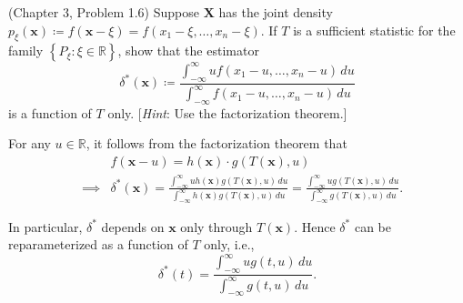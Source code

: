 \begin{question}
  (Chapter 3, Problem 1.6) Suppose \( \mathbf{X} \) has the joint density \( p_\xi(\mathbf{x}) \coloneqq f(\mathbf{x} - \xi) = f(x_1 - \xi,\ldots, x_n - \xi) \). If \( T \) is a sufficient statistic for the family \( \left\{ P_\xi : \xi \in \mathbb{ R } \right\} \), show that the estimator
  \[
    \delta^{*}(\mathbf{x}) \coloneqq \frac{\int_{-\infty}^{\infty} uf(x_1 - u, \ldots, x_n - u)\,du}{\int_{-\infty}^{\infty} f(x_1-u, \ldots, x_n - u)\, du}
  \]
  is a function of \( T \) only. [\textit{Hint}: Use the factorization theorem.]
\end{question}

\begin{solution}
  For any \( u \in \mathbb{ R } \), it follows from the factorization theorem that
  \[
    \begin{aligned}
       &          & f(\mathbf{x} - u) = h(\mathbf{x}) \cdot g(T(\mathbf{x}), u)                                                                                                                                                                                                                \\
       & \implies & \delta^{*}(\mathbf{x}) = \frac{\int_{-\infty}^{\infty} u  h(\mathbf{x})g(T(\mathbf{x}), u)\,du}{\int_{-\infty}^{\infty} h(\mathbf{x})g(T(\mathbf{x}), u)\,du} = \frac{\int_{-\infty}^{\infty} u g(T(\mathbf{x}), u)\,du}{\int_{-\infty}^{\infty} g(T(\mathbf{x}), u)\,du}.
    \end{aligned}
  \]

  In particular, \( \delta^{*} \) depends on \( \mathbf{x} \) only through \( T(\mathbf{x}) \). Hence \( \delta^{*} \) can be reparameterized as a function of \( T \) only, i.e.,
  \[
    \delta^{*}(t) = \frac{\int_{-\infty}^{\infty} u g(t, u)\,du}{\int_{-\infty}^{\infty} g(t, u)\,du}.
  \]
\end{solution}